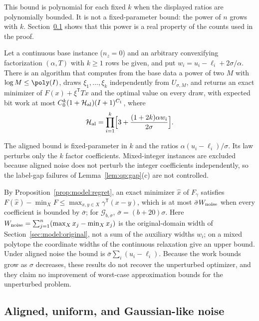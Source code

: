 This bound is polynomial for each fixed $k$ when the displayed ratios are
polynomially bounded. It is not a fixed-parameter bound: the power of $n$
grows with $k$. Section~\ref{sec:qp:ambient} shows that this power is a real
property of the counts used in the proof.

\begin{theorem}\label{thm:qp:aligned}
Let a continuous base instance ($n_z=0$) and an arbitrary convexifying
factorization $(\alpha,T)$ with $k\ge1$ rows be given, and put
$w_i=u_i-\ell_i+2\sigma/\alpha$. There is an algorithm that computes from the
base data a power of two $M$ with $\log M\le\poly(I)$, draws
$\xi_1,\dots,\xi_k$ independently from $U_{\sigma,M}$, and returns an
exact minimizer of $F(x)+\xi^{\mathsf T} Tx$ and the optimal value on every draw,
with expected bit work at most $C_0^k(1+\mathcal H_{\rm al})(I+1)^{C_1}$, where
\[
 \mathcal H_{\rm al}=\prod_{i=1}^k\Bigl[3+\frac{(1+2k)\alpha w_i}{2\sigma}\Bigr].
\]
\end{theorem}

The aligned bound is fixed-parameter in $k$ and the ratios
$\alpha(u_i-\ell_i)/\sigma$. Its law perturbs only the $k$ factor
coefficients. Mixed-integer instances are excluded because aligned noise does
not perturb the integer coefficients independently, so the label-gap failures
of Lemma~\ref{lem:qp:gap}(c) are not controlled.

\begin{remark}\label{rem:qp:regret}
By Proposition~\ref{prop:model:regret}, an exact minimizer $\hat x$ of
$F_\gamma$ satisfies $F(\hat x)-\min_XF\le\max_{x,y\in X}\gamma^{\mathsf T}(x-y)$,
which is at most $\bar\sigma W_{\rm noise}$ when every coefficient is bounded
by $\bar\sigma$; for $\mathcal G_{b,\sigma}$, $\bar\sigma=(b+20)\sigma$. Here
$W_{\rm noise}=\sum_{j=1}^n(\max_Xx_j-\min_Xx_j)$ is the original-domain width
of Section~\ref{sec:model:original}, not a sum of the auxiliary widths $w_i$;
on a mixed polytope the coordinate widths of the continuous relaxation give an
upper bound.
Under aligned noise the bound is $\bar\sigma\sum_i(u_i-\ell_i)$. Because the
work bounds grow as $\sigma$ decreases, these results do not recover the
unperturbed optimizer, and they claim no improvement of worst-case
approximation bounds for the unperturbed problem.
\end{remark}

\subsection{Aligned, uniform, and Gaussian-like noise}\label{sec:qp:ambient}

